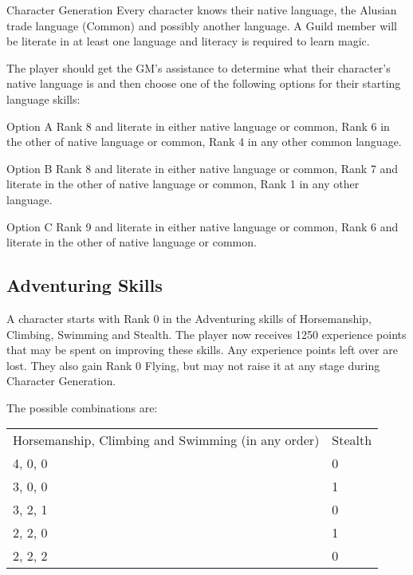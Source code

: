 \begin{Chapter}{Character Generation}
Every character knows their native language, the Alusian trade
language (Common) and possibly another language. A Guild member will
be literate in at least one language and literacy is required to learn
magic.

The player should get the GM’s assistance to determine what their
character’s native language is and then choose one of the following
options for their starting language skills:

\begin{Description}

\item[Option A] Rank 8 and literate in either native language or
  common, Rank 6 in the other of native language or common, Rank 4 in
  any other common language.

\item[Option B] Rank 8 and literate in either native language or
  common, Rank 7 and literate in the other of native language or
  common, Rank 1 in any other language.

\item[Option C] Rank 9 and literate in either native language or
  common, Rank 6 and literate in the other of native language or
  common.

\end{Description}
  
\subsection{Adventuring Skills}

A character starts with Rank 0 in the Adventuring skills of
Horsemanship, Climbing, Swimming and Stealth.  The player now receives
1250 experience points that may be spent on improving these skills.
Any experience points left over are lost. They also gain Rank 0
Flying, but may not raise it at any stage during Character Generation.

The possible combinations are: 

\begin{tabularx}{\columnwidth}{Xl}
Horsemanship, Climbing and Swimming (in any order)	& Stealth \\
4, 0, 0							& 0 \\
3, 0, 0							& 1 \\
3, 2, 1							& 0 \\
2, 2, 0							& 1 \\
2, 2, 2							& 0 \\
\end{tabularx}


\end{Chapter}
